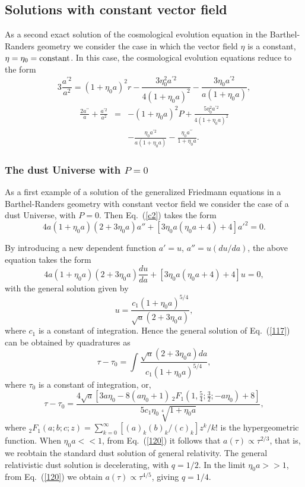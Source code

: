\documentclass[aps,superscriptaddress, showpacs,preprintnumbers, superscriptaddress, nofootinbibt,twocolumn]{revtex4-2}
\def\be{\begin{equation}}
\def\ee{\end{equation}}
\def\bea{\begin{eqnarray}}
\def\eea{\end{eqnarray}}
\begin{document}
\subsection{Solutions with constant vector field}

As a second exact solution of the cosmological evolution equation in the Barthel-Randers geometry we consider the case in which the vector field $\eta$ is a constant, $\eta =\eta _0={\rm constant}$.  In this case, the cosmological evolution equations reduce to the form
\begin{equation}\label{c1}
3\frac{a^{\prime 2}}{a^{2}}=\left( 1+\eta _{0}a\right) ^{2}r-\frac{3\eta
_{0}^{2}a^{\prime 2}}{4\left( 1+\eta _{0}a\right) ^{2}}-\frac{3\eta
_{0}a^{\prime 2}}{a\left( 1+\eta _{0}a\right) },
\end{equation}
\bea\label{c2}
\frac{2a^{\prime \prime }}{a}+\frac{a^{\prime 2}}{a^{2}}&=&-\left( 1+\eta
_{0}a\right) ^{2}P+\frac{5\eta _{0}^{2}a^{\prime 2}}{4\left( 1+\eta
_{0}a\right) ^{2}}\nonumber\\
&&-\frac{\eta _{0}a^{\prime 2}}{a\left( 1+\eta _{0}a\right) }%
-\frac{\eta _{0}a^{\prime \prime }}{1+\eta _{0}a}.
\eea

\subsubsection{The dust Universe with $P=0$}

As a first example of a solution of the generalized Friedmann equations in a Barthel-Randers geometry with constant vector field we consider the case of a dust Universe, with $P=0$. Then Eq.~(\ref{c2}) takes the form
\be\label{117}
 4 a (1+\eta _0 a) (2+3 \eta _0 a) a''+\left[3
   \eta _0 a (\eta _0 a+4)+4\right] a'^2=0.
\ee

 By introducing a new dependent function $a'=u$, $a''=u(du/da)$, the above equation takes the form
 \be
  4 a (1+\eta _0 a) (2+3 \eta _0 a)\frac{du}{da}+\left[3
   \eta _0 a (\eta _0 a+4)+4\right]u=0,
 \ee
 with the general solution given by
 \be\label{119}
 u= \frac{c_1 (1+\eta _0 a)^{5/4}}{\sqrt{a}
   (2+3 \eta _0 a)},
 \ee
where $c_1$ is a constant of integration. Hence the general solution of Eq.~(\ref{117}) can be obtained by quadratures as
\be\label{120}
\tau-\tau_0=\int{\frac{\sqrt{a}\left(2+3\eta_0a\right)da}{c_1\left(1+\eta _0a\right)^{5/4}}},
\ee
where $\tau _0$ is a constant of integration, or,
\be\label{121}
\tau-\tau_0=\frac{4 \sqrt{a} \left[3 a \eta _0-8 (a \eta _0+1) \,
   _2F_1\left(1,\frac{5}{4};\frac{3}{2};-a \eta _0\right)+8\right]}{5 c_1
   \eta _0 \sqrt[4]{1+\eta _0a }},
\ee
where $_2F_1(a;b;c;z)=\sum_{k=0}^{\infty}{\left[(a)_k(b)_k/(c)_k\right]z^k/k!}$ is the hypergeometric function. When $\eta _0a<<1$, from Eq.~(\ref{120}) it follows that $a(\tau)\propto \tau ^{2/3}$, that is, we reobtain the standard dust solution of general relativity. The general relativistic dust solution is decelerating, with $q=1/2$. In the limit $\eta _0a>>1$, from Eq.~(\ref{120}) we obtain $a(\tau)\propto \tau ^{4/5}$, giving $q=1/4$.
\end{document}

